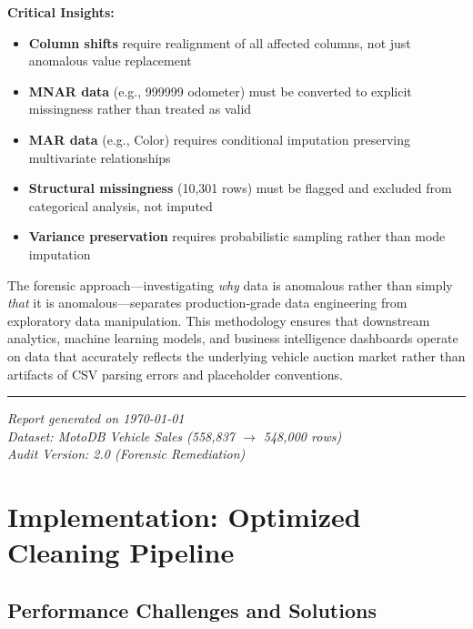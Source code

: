 \documentclass[12pt,a4paper]{article}
\begin{document}
\textbf{Critical Insights:}
\begin{itemize}
    \item \textbf{Column shifts} require realignment of all affected columns, not just anomalous value replacement
    \item \textbf{MNAR data} (e.g., 999999 odometer) must be converted to explicit missingness rather than treated as valid
    \item \textbf{MAR data} (e.g., Color) requires conditional imputation preserving multivariate relationships
    \item \textbf{Structural missingness} (10,301 rows) must be flagged and excluded from categorical analysis, not imputed
    \item \textbf{Variance preservation} requires probabilistic sampling rather than mode imputation
\end{itemize}

The forensic approach---investigating \textit{why} data is anomalous rather than simply \textit{that} it is anomalous---separates production-grade data engineering from exploratory data manipulation. This methodology ensures that downstream analytics, machine learning models, and business intelligence dashboards operate on data that accurately reflects the underlying vehicle auction market rather than artifacts of CSV parsing errors and placeholder conventions.

\vspace{1cm}
\noindent\rule{\textwidth}{0.4pt}
\begin{center}
\textit{Report generated on \today\\
Dataset: MotoDB Vehicle Sales (558,837 $\rightarrow$ 548,000 rows)\\
Audit Version: 2.0 (Forensic Remediation)}
\end{center}




\section{Implementation: Optimized Cleaning Pipeline}

\subsection{Performance Challenges and Solutions}
\end{document}

